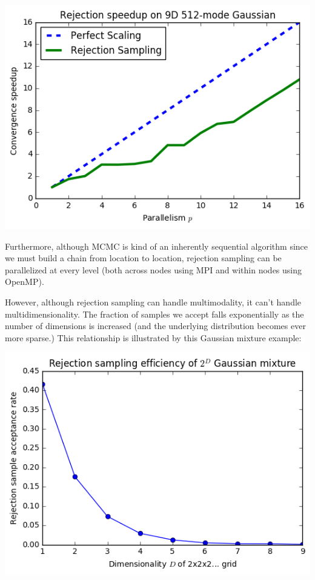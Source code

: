 \documentclass{article}
\begin{document}
\includegraphics[width=\textwidth]{rej-scaling.png}

Furthermore, although MCMC is kind of an inherently sequential algorithm since
we must build a chain from location to location, rejection sampling can be
parallelized at every level (both across nodes using MPI and within nodes using
OpenMP).

However, although rejection sampling can handle multimodality, it can't handle
multidimensionality. The fraction of samples we accept falls exponentially as
the number of dimensions is increased (and the underlying distribution becomes
ever more sparse.) This relationship is illustrated by this Gaussian mixture
example:

\includegraphics[width=\textwidth]{rej-dim-scaling.png}
\end{document}
